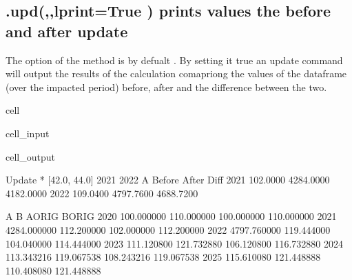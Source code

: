 \documentclass[letterpaper,10pt,english]{jupyterBook}
\begin{document}
\subsection{.upd(,,lprint=True ) prints values the before and after update}
\label{\detokenize{content/04_PythonEssentials/UpdateCommand:upd-lprint-true-prints-values-the-before-and-after-update}}
\sphinxAtStartPar
The  option of the method  is by defualt .  By setting it true an update command will output the results of the calculation comapriong the values of the dataframe (over the impacted period) before, after and the difference between the two.

\begin{sphinxuseclass}{cell}\begin{sphinxVerbatimInput}

\begin{sphinxuseclass}{cell_input}
\begin{sphinxVerbatim}[commandchars=\\\{\}]
\end{sphinxVerbatim}

\end{sphinxuseclass}\end{sphinxVerbatimInput}
\begin{sphinxVerbatimOutput}

\begin{sphinxuseclass}{cell_output}
\begin{sphinxVerbatim}[commandchars=\\\{\}]
Update * [42.0, 44.0] 2021 2022
A                    Before                After                 Diff
2021               102.0000            4284.0000            4182.0000
2022               109.0400            4797.7600            4688.7200
\end{sphinxVerbatim}

\begin{sphinxVerbatim}[commandchars=\\\{\}]
                A           B      A\PYGZus{}ORIG      B\PYGZus{}ORIG
2020   100.000000  110.000000  100.000000  110.000000
2021  4284.000000  112.200000  102.000000  112.200000
2022  4797.760000  119.444000  104.040000  114.444000
2023   111.120800  121.732880  106.120800  116.732880
2024   113.343216  119.067538  108.243216  119.067538
2025   115.610080  121.448888  110.408080  121.448888
\end{sphinxVerbatim}

\end{sphinxuseclass}\end{sphinxVerbatimOutput}

\end{sphinxuseclass}
\end{document}
